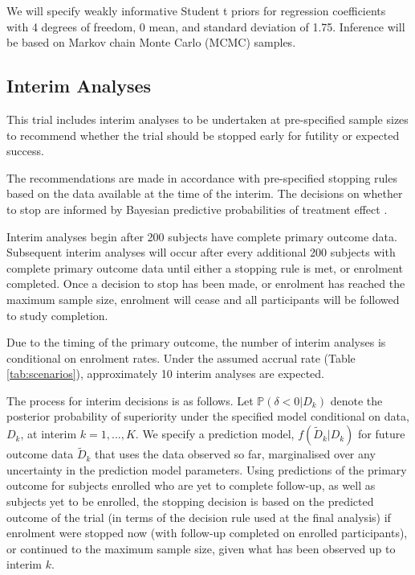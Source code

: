 \documentclass{bmcart}
\begin{document}
We will specify weakly informative Student t priors for regression coefficients with 4 degrees of freedom, 0 mean, and standard deviation of 1.75.
Inference will be based on Markov chain Monte Carlo (MCMC) samples.


\subsection*{Interim Analyses}

This trial includes interim analyses to be undertaken at pre-specified sample sizes to recommend whether the trial should be stopped early for futility or expected success.

The recommendations are made in accordance with pre-specified stopping rules based on the data available at the time of the interim.
The decisions on whether to stop are informed by Bayesian predictive probabilities of treatment effect \cite{spiegelhalter2004bayesian}.

Interim analyses begin after 200 subjects have complete primary outcome data.
Subsequent interim analyses will occur after every additional 200 subjects with complete primary outcome data until either a stopping rule is met, or enrolment completed.
Once a decision to stop has been made, or enrolment has reached the maximum sample size, enrolment will cease and all participants will be followed to study completion.

Due to the timing of the primary outcome, the number of interim analyses is conditional on enrolment rates.
Under the assumed accrual rate (Table \ref{tab:scenarios}), approximately 10 interim analyses are expected.


The process for interim decisions is as follows.
Let $\mathbb P(\delta < 0|D_k)$ denote the posterior probability of superiority under the specified model conditional on data, $D_k$, at interim $k=1,...,K$.
We specify a prediction model, $f(\tilde D_k|D_k)$ for future outcome data $\tilde D_k$ that uses the data observed so far, marginalised over any uncertainty in the prediction model parameters.
Using predictions of the primary outcome for subjects enrolled who are yet to complete follow-up, as well as subjects yet to be enrolled, the stopping decision is based on the predicted outcome of the trial (in terms of the decision rule used at the final analysis) if enrolment were stopped now (with follow-up completed on enrolled participants), or continued to the maximum sample size, given what has been observed up to interim $k$.
\end{document}
